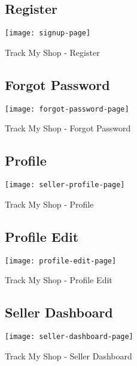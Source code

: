 \vspace{2cm}

\begin{figure}[h]
	\subsection{Register\\}
	\centering
	\texttt{[image: signup-page]}
	\caption{Track My Shop - Register}
\end{figure}
\newpage

\begin{figure}[h]
	\subsection{Forgot Password\\}
	\centering
	\texttt{[image: forgot-password-page]}
	\caption{Track My Shop - Forgot Password}
\end{figure}

\vspace{2cm}

\begin{figure}[h]
	\subsection{Profile\\}
	\centering
	\texttt{[image: seller-profile-page]}
	\caption{Track My Shop - Profile}
\end{figure}
\newpage

\begin{figure}[h]
	\subsection{Profile Edit\\}
	\centering
	\texttt{[image: profile-edit-page]}
	\caption{Track My Shop - Profile Edit}
\end{figure}

\vspace{2cm}

\begin{figure}[h]
	\subsection{Seller Dashboard\\}
	\centering
	\texttt{[image: seller-dashboard-page]}
	\caption{Track My Shop - Seller Dashboard}
\end{figure}
\newpage

